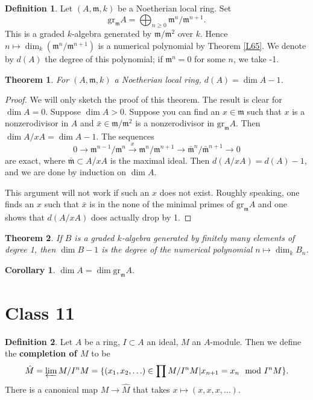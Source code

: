 \documentclass{article}
\newcommand{\fr}{\mathfrak}
\theoremstyle{plain}
\newtheorem*{thm*}{Theorem}
\newtheorem*{cor*}{Corollary}
\theoremstyle{definition}
\newtheorem{defn}{Definition}
\theoremstyle{remark}
\begin{document}
\begin{defn}
Let $(A,\fr m, k)$ be a Noetherian local ring. Set
\[\text{gr}_\fr m A=\bigoplus_{n\geq0}\fr m^n/\fr m^{n+1}.\]
This is a graded $k$-algebra generated by $\fr m/\fr m^2$ over $k$. Hence
$n\mapsto\dim_k(\fr m^n/\fr m^{n+1})$ is a numerical polynomial by Theorem \ref{L65}.
We denote by $d(A)$ the degree of this polynomial; if $\fr m^n=0$ for some $n$, we take -1.
\end{defn}

\begin{thm*}
For $(A,\fr m,k)$ a Noetherian local ring, $d(A)=\dim A-1$.
\end{thm*}
\begin{proof}
We will only sketch the proof of this theorem.
The result is clear for $\dim A=0$. Suppose $\dim A>0$. Suppose you can find an $x\in\fr m$ such that $x$ is a nonzerodivisor in $A$ and $\bar x\in\fr m/\fr m^2$ is a nonzerodivisor in $\text{gr}_\fr m A$. Then $\dim A/xA=\dim A-1$. The sequences
\[0\to\fr m^{n-1}/\fr m^n\overset{x}{\to}\fr m^n/\fr m^{n+1}\to \bar{\fr m}^n/\bar{\fr m}^{n+1}\to 0 \]
are exact, where $\bar{\fr m}\subset A/xA$ is the maximal ideal. Then $d(A/xA)=d(A)-1$, and we are done by induction on $\dim A$.

This argument will not work if such an $x$ does not exist. Roughly speaking, one finds an $x$ such that $\bar x$ is in the none of the minimal primes of $\text{gr}_\fr mA$ and one shows that $d(A/xA)$ does actually drop by 1.
\end{proof}

\begin{thm*}
If $B$ is a graded $k$-algebra generated by finitely many elements of degree 1, then $\dim B-1$ is the degree of the numerical polynomial $n\mapsto\dim_k B_n$.
\end{thm*}

\begin{cor*}
$\dim A=\dim\text{gr}_\fr m A.$
\end{cor*}

\section*{Class 11}

\begin{defn}
Let $A$ be a ring, $I\subset A$ an ideal, $M$ an $A$-module. Then we define the \textbf{completion of $M$} to be
\[\hat M=\varprojlim M/I^nM=\{(x_1,x_2,\ldots)\in \prod M/I^nM | x_{n+1}=x_n\mod I^nM\}.\]
There is a canonical map $M\to\hat M$ that takes $x\mapsto (x,x,x,\ldots)$.
\end{defn}
\end{document}
